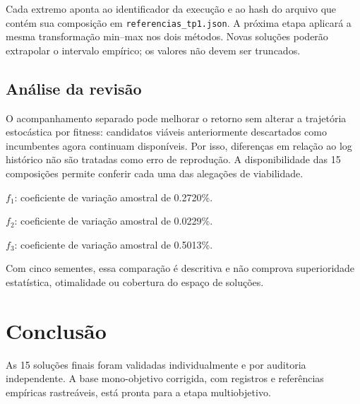 Cada extremo aponta ao identificador da execução e ao hash do arquivo que contém sua composição em \texttt{referencias\_tp1.json}. A próxima etapa aplicará a mesma transformação min--max nos dois métodos. Novas soluções poderão extrapolar o intervalo empírico; os valores não devem ser truncados.

\subsection{Análise da revisão}

O acompanhamento separado pode melhorar o retorno sem alterar a trajetória estocástica por fitness: candidatos viáveis anteriormente descartados como incumbentes agora continuam disponíveis. Por isso, diferenças em relação ao log histórico não são tratadas como erro de reprodução. A disponibilidade das 15 composições permite conferir cada uma das alegações de viabilidade.

$f_1$: coeficiente de variação amostral de \num{0.2720}\%.

$f_2$: coeficiente de variação amostral de \num{0.0229}\%.

$f_3$: coeficiente de variação amostral de \num{0.5013}\%.

Com cinco sementes, essa comparação é descritiva e não comprova superioridade estatística, otimalidade ou cobertura do espaço de soluções.

\section{Conclusão}

As 15 soluções finais foram validadas individualmente e por auditoria independente. A base mono-objetivo corrigida, com registros e referências empíricas rastreáveis, está pronta para a etapa multiobjetivo.
